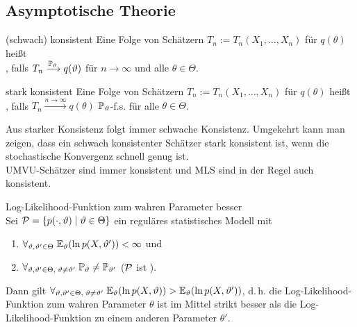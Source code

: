 \pagebreak

\subsection{%
    Asymptotische Theorie%
}

\begin{Def}{(schwach) konsistent}
    Eine Folge von Schätzern $T_n := T_n(X_1, \dotsc, X_n)$ für $q(\theta)$ heißt\\
    , falls
    $T_n \xrightarrow{\PP_\theta} q(\theta)$ für $n \to \infty$ und alle $\theta \in \Theta$.
\end{Def}

\begin{Def}{stark konsistent}
    Eine Folge von Schätzern $T_n := T_n(X_1, \dotsc, X_n)$ für $q(\theta)$ heißt\\
    , falls
    $T_n \xrightarrow{n \to \infty} q(\theta)$ $\PP_\theta$-f.s. für alle $\theta \in \Theta$.
\end{Def}

\begin{Bem}
    Aus starker Konsistenz folgt immer schwache Konsistenz.
    Umgekehrt kann man zeigen, dass ein schwach konsistenter Schätzer stark konsistent ist,
    wenn die stochastische Konvergenz schnell genug ist.\\
    UMVU-Schätzer sind immer konsistent und MLS sind in der Regel auch konsistent.
\end{Bem}

\linie

\begin{Satz}{Log-Likelihood-Funktion zum wahren Parameter besser}\\
    Sei $\P = \{p(\cdot, \theta) \;|\; \theta \in \Theta\}$
    ein reguläres statistisches Modell mit
    \begin{enumerate}
        \item
        $\forall_{\theta, \theta' \in \Theta}\; \EE_\theta(\ln p(X, \theta')) < \infty$ und

        \item
        $\forall_{\theta, \theta' \in \Theta,\; \theta \not= \theta'}\;
        \PP_\theta \not= \PP_{\theta'}$
        ($\P$ ist ).
    \end{enumerate}
    Dann gilt $\forall_{\theta, \theta' \in \Theta,\; \theta \not= \theta'}\;
    \EE_\theta(\ln p(X, \theta)) > \EE_\theta(\ln p(X, \theta'))$,
    d.\,h. die Log-Likelihood-Funktion zum wahren Parameter $\theta$ ist im Mittel strikt besser
    als die Log-Likelihood-Funktion zu einem anderen Parameter $\theta'$.
\end{Satz}


